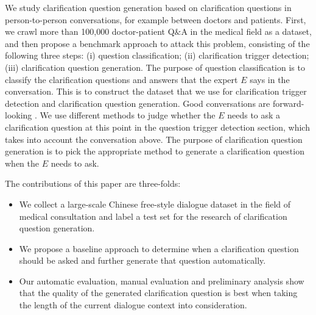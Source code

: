 We study clarification question generation based on clarification questions in person-to-person conversations, for example between doctors and patients. First, we crawl more than 100,000 doctor-patient Q$\&$A in the medical field as a dataset, and then propose a benchmark approach to attack this problem, 
consisting of the following three steps: (i) question classification; (ii) clarification trigger detection; (iii) clarification question generation. The purpose of question classification is to classify the clarification questions and answers that the expert $E$ says in the conversation. This is to construct the dataset that we use for clarification trigger detection and clarification question generation. 
Good conversations are forward-looking \cite{DBLP:journals/jsemantics/AllwoodNA92}. We use different methods to judge whether the $E$ needs to ask a clarification question at this point in the question trigger detection section, which takes into account the conversation above. The purpose of clarification question generation is to pick the appropriate method to generate a clarification question when the $E$ needs to ask.

The contributions of this paper are three-folds:
\begin{itemize}
    \item We collect a large-scale Chinese free-style dialogue dataset in the field of medical consultation and label a test set for the research of clarification question generation.
    \item We propose a baseline approach to determine when a clarification question should be asked and further generate that question automatically.
    \item Our automatic evaluation, manual evaluation and preliminary analysis show that the quality of the generated clarification question is best when taking the length of the current dialogue context into consideration. 
\end{itemize}

